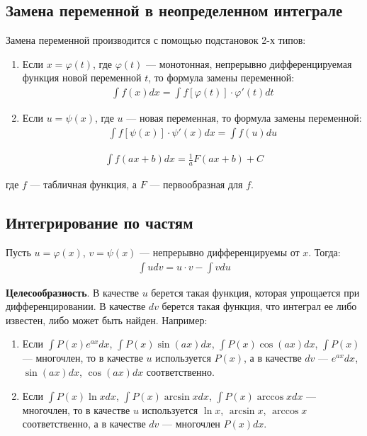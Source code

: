 \documentclass[a4paper,12pt,oneside]{extbook}
\theoremstyle{numbered}
\theoremstyle{unnumbered}
\theoremstyle{named}
\theoremstyle{unnumbered}
\theoremstyle{named}
\theoremstyle{named}
\theoremstyle{named}
\begin{document}
\subsection{Замена переменной в неопределенном интеграле}%
\label{sub:Замена переменной в неопределенном интеграле}

Замена переменной производится с помощью подстановок 2-х типов:
\begin{enumerate}
    \item {
          Если \(x = \varphi(t)\), где \(\varphi(t)\) — монотонная, непрерывно дифференцируемая функция новой переменной \(t\), то формула замены переменной:
          \begin{gather*}
              \int f(x)dx = \int f [\varphi(t)] \cdot \varphi'(t)dt
          \end{gather*}
          }
    \item {
          Если \(u = \psi(x)\), где \(u\) — новая переменная, то формула замены переменной:
          \begin{gather*}
              \int f[\psi(x)] \cdot \psi'(x) dx = \int f(u)du
          \end{gather*}
          }
\end{enumerate}

\begin{gather*}
    \int f(ax + b) dx = \frac{1}{a} F(ax + b) + C
\end{gather*}

где \(f\) — табличная функция, а \(F\) — первообразная для \(f\).

\subsection{Интегрирование по частям}%
\label{sub:Интегрирование по частям}

Пусть \(u = \varphi(x)\), \(v = \psi(x)\) — непрерывно дифференцируемы от \(x\). Тогда:
\begin{gather*}
    \int udv = u \cdot v - \int vdu
\end{gather*}

\textbf{Целесообразность}. В качестве \(u\) берется такая функция, которая упрощается при дифференцировании. В качестве \(dv\) берется такая функция, что интеграл ее либо известен, либо может быть найден. Например:

\begin{enumerate}
    \item {Если \(\int P(x) e^{ax} dx\), \(\int P(x) \sin(ax)dx\), \(\int P(x) \cos(ax)dx\), \(\int P(x)\) — многочлен, то в качестве \(u\) используется \(P(x)\), а в качестве \(dv\) — \(e^{ax}dx\), \(\sin(ax)dx\), \(\cos(ax)dx\) соответственно.}
    \item {Если \(\int P(x) \ln{x}dx\), \(\int P(x) \arcsin{x}dx\), \(\int P(x) \arccos{x}dx\) — многочлен, то в качестве \(u\) используется \(\ln{x}\), \(\arcsin{x}\), \(\arccos{x}\) соответственно, а в качестве \(dv\) — многочлен \(P(x)dx\).}
\end{enumerate}
\end{document}
